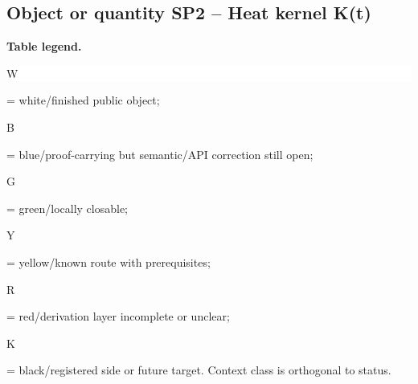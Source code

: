 \subsection*{Object or quantity SP2 -- Heat kernel K(t)}
\hypertarget{objproof:SP2}{}
\par\smallskip\noindent\begin{minipage}{0.99\linewidth}\footnotesize\raggedright\textbf{Table legend.} \colorbox{white}{\strut W} = white/finished public object; \colorbox{cyan!20}{\strut B} = blue/proof-carrying but semantic/API correction still open; \colorbox{green!18}{\strut G} = green/locally closable; \colorbox{yellow!25}{\strut Y} = yellow/known route with prerequisites; \colorbox{red!20}{\strut R} = red/derivation layer incomplete or unclear; \colorbox{black!18}{\strut K} = black/registered side or future target. Context class is orthogonal to status.\end{minipage}\par\vspace{0.25em}
